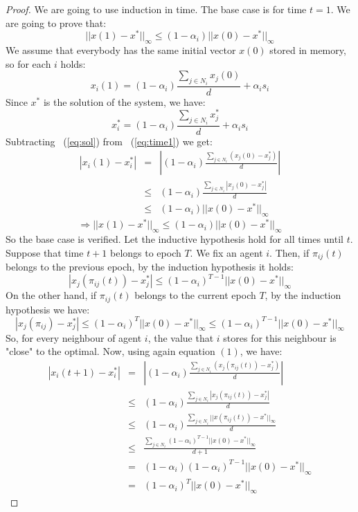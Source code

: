 \begin{proof}
We are going to use induction in time. The base case is for time $t=1$. We are going to prove that: $$ ||x(1)-x^*||_{\infty} \leq (1-\alpha_i)||x(0)-x^*||_{\infty}$$
We assume that everybody has the same initial vector $x(0)$ stored in memory, so for each $i$ holds:
\begin{equation}\label{eq:time1}
x_i(1) = (1-\alpha_i)\frac{\sum_{j \in N_i}x_j(0)}{d}+\alpha_i s_i 
\end{equation}
Since $x^*$ is the solution of the system, we have:
\begin{equation}\label{eq:sol}
x_i^* = (1-\alpha_i)\frac{\sum_{j \in N_i}x_j^*}{d}+\alpha_i s_i 
\end{equation}
Subtracting ~(\ref{eq:sol}) from ~(\ref{eq:time1}) we get:
\begin{eqnarray*}
|x_i(1) - x_i^*| &=& |(1-\alpha_i)\frac{\sum_{j \in N_i}(x_j(0)-x_j^*)}{d}|\\
&\leq& (1-\alpha_i)\frac{\sum_{j \in N_i}|x_j(0)-x_j^*|}{d} \\
&\leq& (1-\alpha_i) ||x(0)-x^*||_{\infty}
\end{eqnarray*}
$$ \Rightarrow ||x(1)-x^*||_{\infty} \leq (1-\alpha_i)||x(0)-x^*||_{\infty}$$
So the base case is verified. Let the inductive hypothesis hold for all times until $t$. Suppose that time $t+1$ belongs to epoch $T$. We fix an agent $i$. Then, if $\pi_{ij}(t)$ belongs to the previous epoch, by the induction hypothesis it holds:
$$ |x_j(\pi_{ij}(t)) - x_j^*| \leq \left( 1-\alpha_i\right)^{T-1}||x(0)-x^*||_{\infty}$$
 On the other hand, if $\pi_{ij}(t)$ belongs to the current epoch $T$, by the induction hypothesis we have:
 $$ |x_j(\pi_{ij}) - x_j^*| \leq \left( 1-\alpha_i\right)^{T}||x(0)-x^*||_{\infty} \leq \left( 1-\alpha_i\right)^{T-1}||x(0)-x^*||_{\infty}$$
 So, for every neighbour of agent $i$, the value that $i$ stores for this neighbour is "close" to the optimal. Now, using again equation $(1)$, we have:
 \begin{eqnarray*}
|x_i(t+1) - x_i^*| &=& |(1-\alpha_i)\frac{\sum_{j \in N_i}(x_j(\pi_{ij}(t))-x_j^*)}{d}|\\
&\leq& (1-\alpha_i)\frac{\sum_{j \in N_i}|x_j(\pi_{ij}(t))-x_j^*|}{d}\\
&\leq& (1-\alpha_i)\frac{\sum_{j \in N_i}||x(\pi_{ij}(t))-x^*||_\infty}{d}\\
&\leq& \frac{\sum_{j \in N_i}\left(1-\alpha_i\right)^{T-1}||x(0)-x^*||_{\infty}}{d+1}\\
&=& (1-\alpha_i)\left(1-\alpha_i\right)^{T-1}||x(0)-x^*||_{\infty}\\
&=& \left(1-\alpha_i\right)^{T}||x(0)-x^*||_{\infty}
 \end{eqnarray*}

\end{proof}

